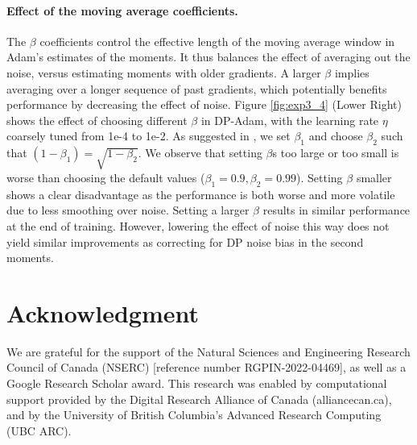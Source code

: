 \documentclass[letterpaper]{article} %
\begin{document}
\paragraph{Effect of the moving average coefficients.}
The $\beta$ coefficients control the effective length of the moving average window in Adam's estimates of the moments. It thus balances the effect of averaging out the noise, versus estimating moments with older gradients. A larger $\beta$ implies averaging over a longer sequence of past gradients, which potentially benefits performance by decreasing the effect of noise. Figure \ref{fig:exp3_4} (Lower Right) shows the effect of choosing different $\beta$ in DP-Adam, with the learning rate $\eta$ coarsely tuned from 1e-4 to 1e-2. As suggested in \citet{orig_adam}, we set $\beta_1$ and choose $\beta_2$ such that $(1-\beta_1) = \sqrt{1-\beta_2}$. We observe that setting $\beta$s too large or too small is worse than choosing the default values ($\beta_1=0.9, \beta_2=0.99$). Setting $\beta$ smaller shows a clear disadvantage as the performance is both worse and more volatile due to less smoothing over noise. Setting a larger $\beta$ results in similar performance at the end of training. However, lowering the effect of noise this way does not yield similar improvements as correcting for DP noise bias in the second moments.

\clearpage\clearpage

\section*{Acknowledgment}
We are grateful for the support of the Natural Sciences and Engineering Research Council of Canada (NSERC) [reference number RGPIN-2022-04469], as well as a Google Research Scholar award. This research was enabled by computational support provided by the Digital Research Alliance of Canada (alliancecan.ca), and by the University of British Columbia's Advanced Research Computing (UBC ARC).
\end{document}

